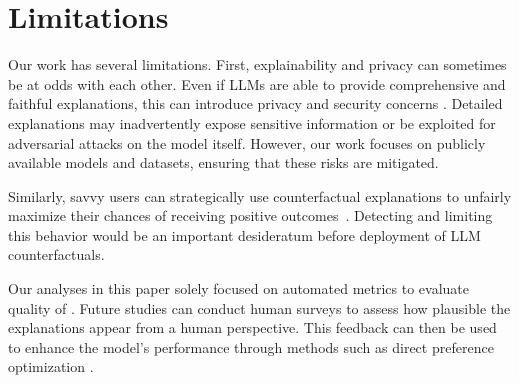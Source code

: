 \section{Limitations}
Our work has several limitations. First, explainability and privacy can sometimes be at odds with each other. Even if LLMs are able to provide comprehensive and faithful explanations, this can introduce privacy and security concerns \citep{pawlicki2024explainability, grant2020show}. Detailed explanations may inadvertently expose sensitive information or be exploited for adversarial attacks on the model itself. However, our work focuses on publicly available models and datasets, ensuring that these risks are mitigated. 

Similarly, savvy users can strategically use counterfactual explanations to unfairly maximize their chances of receiving positive outcomes~\cite{tsirtsis2020decisions}. Detecting and limiting this behavior would be an important desideratum before deployment of LLM counterfactuals. 

Our analyses in this paper solely focused on automated metrics to evaluate quality of \SCEs.
Future studies can conduct human surveys to assess how plausible the explanations appear from a human perspective. This feedback can then be used to enhance the model's performance through methods such as direct preference optimization \citep{rafailov2024direct}. 

